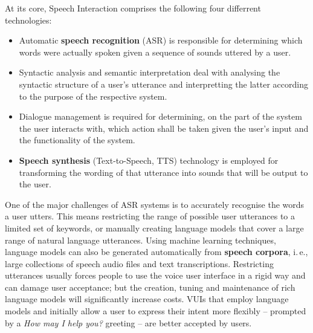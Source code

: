 \begin{multicols}{2}
At its core, Speech Interaction comprises the following four differrent technologies:

    \begin{itemize}
      \item Automatic \textbf{speech recognition} (ASR) is responsible for determining which words were actually spoken given a sequence of sounds uttered by a user.
      \item Syntactic analysis and 
semantic interpretation deal with analysing the syntactic structure of a user’s utterance and interpretting the latter according to the purpose of the respective system.
      \item Dialogue management is required for determining, on the part of the system the user interacts with, which action shall be taken given the user’s input and the functionality of the system.
      \item \textbf{Speech synthesis} (Text-to-Speech, TTS) technology is employed for transforming the wording of that utterance into sounds that will be output to the user. 

    \end{itemize}


One of the major challenges of ASR systems is to accurately recognise the words a user utters. This means restricting the range of possible user utterances to a limited set of keywords, or manually creating language models that cover a large range of natural language utterances. Using machine learning techniques, language models can also be generated automatically from \textbf{speech corpora}, i.\,e., large collections of speech audio files and text transcriptions. Restricting utterances usually forces people to use the voice user interface in a rigid way and can damage user acceptance; but the creation, tuning and maintenance of rich language models will significantly increase costs. VUIs that employ language models and initially allow a user to express their intent more flexibly -- prompted by a \textit{How may I help you?} greeting -- are better accepted by users.


\end{multicols}
